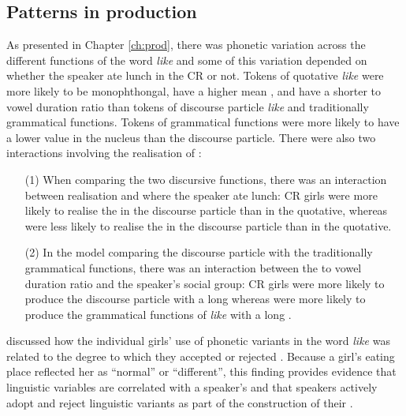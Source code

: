  \subsection{Patterns in production}
 

As presented in Chapter \ref{ch:prod}, there was phonetic variation across the different functions of the word \textit{like} and some of this variation depended on whether the speaker ate lunch in the CR or not.  Tokens of quotative \textit{like} were more likely to be monophthongal, have a higher mean , and have a shorter  to vowel duration ratio than tokens of discourse particle \textit{like} and traditionally grammatical functions.  Tokens of grammatical functions were more likely to have a lower  value in the nucleus than the discourse particle.  There were also two interactions involving the realisation of : 
\begin{enumerate}
	\item[(1)] When comparing the two discursive functions, there was an interaction between  realisation and where the speaker ate lunch: CR girls were more likely to realise the  in the discourse particle than in the quotative, whereas  were less likely to realise the  in the discourse particle than in the quotative.  

	\item[(2)] In the model comparing the discourse particle with the traditionally grammatical functions, there was an interaction between the  to vowel duration ratio and the speaker's social group: CR girls were more likely to produce the discourse particle with a long  whereas  were more likely to produce the grammatical functions of \textit{like} with a long .

\end{enumerate}
  

\noindent {} discussed how the individual girls' use of phonetic variants in the word \textit{like} was related to the degree to which they accepted or rejected .  Because a girl's eating place reflected her  as ``normal'' or ``different'', this finding provides evidence that linguistic variables are correlated with a speaker's  and that speakers actively adopt and reject linguistic variants as part of the construction of their .


